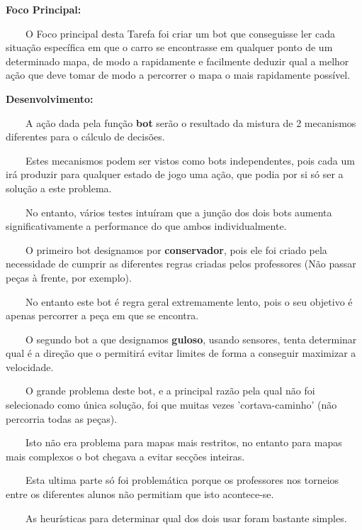 \documentclass[a4paper]{report} %
\begin{document}
           
           \vspace{5mm} 
           \par \textbf{ Foco Principal:} 
           \par \ \ \ \ O Foco principal desta Tarefa foi criar um bot que conseguisse ler cada situação específica em que o carro se encontrasse em qualquer ponto de um determinado mapa, de modo a rapidamente e facilmente deduzir qual a melhor ação que deve tomar de modo a percorrer o mapa o mais rapidamente possível. 
           \vspace{5mm}
           \par \textbf{Desenvolvimento:}
           \par \ \ \ \ A ação dada pela função \textbf{bot} serão o resultado da mistura de 2 mecanismos diferentes para o cálculo de decisões.
           \par \ \ \ \ Estes mecanismos podem ser vistos como bots independentes,
pois cada um irá produzir para qualquer estado de jogo uma ação, que podia por si só ser a solução a este problema. 
           \par \ \ \ \ No entanto, vários testes intuíram que a junção dos dois bots aumenta significativamente a performance do que ambos individualmente.
           \par \ \ \ \ O primeiro bot designamos por \textbf{conservador}, pois ele foi criado pela necessidade de cumprir as diferentes regras criadas pelos professores (Não passar peças à frente, por exemplo).
           \par \ \ \ \ No entanto este bot é regra geral extremamente lento, pois o seu objetivo é apenas percorrer a peça em que se encontra.
           \par \ \ \ \ O segundo bot a que designamos \textbf{guloso}, usando sensores, tenta determinar qual é a direção que o permitirá evitar limites de forma a conseguir maximizar a velocidade. 
           \par \ \ \ \ O grande problema deste bot, e a principal razão pela qual não foi selecionado como única solução, foi que muitas vezes 'cortava-caminho' (não percorria todas as peças).
           \par \ \ \ \ Isto não era problema para mapas mais restritos, no entanto para mapas mais complexos o bot chegava a evitar secções inteiras.
           \par \ \ \ \ Esta ultima parte só foi problemática porque os professores nos torneios entre os diferentes alunos não permitiam que isto acontece-se.
           \par \ \ \ \ As heurísticas para determinar qual dos dois usar foram bastante simples.
\end{document}
